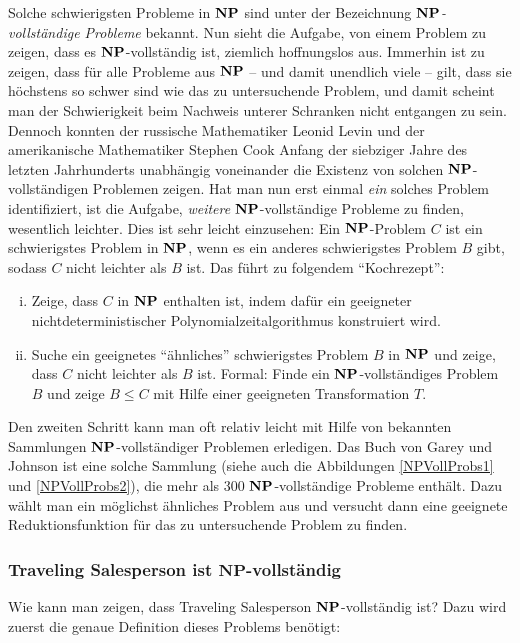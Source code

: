 Solche schwierigsten Probleme in $\mathbf{N}\mathbf{P}$ sind unter der Bezeichnung
\emph{$\mathbf{N}\mathbf{P}$-vollständige Probleme}
bekannt. Nun sieht die Aufgabe, von einem Problem zu zeigen, dass es
$\mathbf{N}\mathbf{P}$-vollständig ist, ziemlich hoffnungslos aus. Immerhin ist zu
zeigen, dass für alle Probleme aus $\mathbf{N}\mathbf{P}$ -- und damit unendlich viele
-- gilt, dass sie höchstens so schwer sind wie das zu untersuchende
Problem, und damit scheint man der Schwierigkeit beim Nachweis unterer
Schranken nicht entgangen zu sein. Dennoch konnten der russische
Mathematiker Leonid Levin und der amerikanische Mathematiker Stephen
Cook Anfang der siebziger Jahre des letzten Jahrhunderts unabhängig
voneinander die Existenz von solchen $\mathbf{N}\mathbf{P}$-vollständigen Problemen
zeigen. Hat man nun erst einmal \emph{ein} solches Problem
identifiziert, ist die Aufgabe, \emph{weitere} $\mathbf{N}\mathbf{P}$-vollständige
Probleme zu finden, wesentlich leichter. Dies ist sehr leicht
einzusehen: Ein $\mathbf{N}\mathbf{P}$-Problem $C$ ist ein schwierigstes Problem in
$\mathbf{N}\mathbf{P}$, wenn es ein anderes schwierigstes Problem $B$ gibt, sodass $C$
nicht leichter als $B$ ist.  Das führt zu folgendem "`Kochrezept"':
\medskip

\begin{enumerate}[i)]
\item Zeige, dass $C$ in $\mathbf{N}\mathbf{P}$ enthalten ist, indem dafür ein
geeigneter nichtdeterministischer Polynomialzeitalgorithmus
konstruiert wird.
\item Suche ein geeignetes "`ähnliches"' schwierigstes Problem $B$ in
$\mathbf{N}\mathbf{P}$ und zeige, dass $C$ nicht leichter als $B$ ist. Formal: Finde ein
$\mathbf{N}\mathbf{P}$-vollständiges Problem $B$ und zeige $B \le C$ mit Hilfe einer
geeigneten Transformation $T$.
\end{enumerate}

Den zweiten Schritt kann man oft relativ leicht mit Hilfe von
bekannten Sammlungen $\mathbf{N}\mathbf{P}$-vollständiger Problemen erledigen. Das Buch
von Garey und Johnson \cite{GaJo79} ist eine solche Sammlung (siehe
auch die Abbildungen \ref{NPVollProbs1} und \ref{NPVollProbs2}), die
mehr als $300$ $\mathbf{N}\mathbf{P}$-vollständige Probleme enthält. Dazu wählt man ein
möglichst ähnliches Problem aus und versucht dann eine geeignete
Reduktionsfunktion für das zu untersuchende Problem zu finden.

\goodbreak
\subsubsection{Traveling Salesperson ist $\mathbf{NP}$-vollständig}
Wie kann man zeigen, dass Traveling Salesperson $\mathbf{N}\mathbf{P}$-vollständig ist?
Dazu wird zuerst die genaue Definition dieses Problems benötigt:

